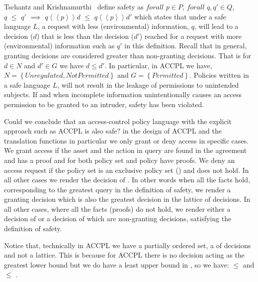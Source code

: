 Tschantz and Krishnamurthi~\cite{Tschantz} define safety as $forall$ $p \in P$, $forall$ $q, q' \in Q$, \\$q$ $\leq$ $q'$ $\implies$ $q \left\langle\left\langle p  \right\rangle\right\rangle d$ $\leq$ $q \left\langle\left\langle p  \right\rangle\right\rangle d'$ which states that under a safe language $L$, a request with less (environmental) information, $q$, will lead to a decision ($d$) that is less than the decision ($d'$) reached for a request with more (environmental) information such as $q'$ in this definition. Recall that in general, granting decisions are considered greater than non-granting decisions. That is for $d \in N$ and $d' \in G$ we have $d \leq d'$. In particular, in \ac{ACCPL} we have,  $N = \left\{ {Unregulated, NotPermitted}\right\}$ and $G = \left\{ {Permitted}\right\}$. Policies written in a safe language $L$, will not result in the leakage of permissions to unintended subjects. If and when incomplete information unintentionally causes an access permission to be granted to an intruder, safety has been violated.

Could we conclude that an access-control policy language with the explicit approach such as \ac{ACCPL} is also safe? in the design of \ac{ACCPL} and the translation functions in particular we only grant or deny access in specific cases. We grant access if the asset and the action in query are found in the agreement and  has a proof and  for both policy set and policy have proofs. We deny an access request if the policy set is an exclusive policy set () and  does not hold. In all other cases we render the decision of . In other words when all the facts hold, corresponding to the greatest query in the definition of safety, we render a granting decision which is also the greatest decision in the lattice of decisions. In all other cases, where all the facts (proofs) do not hold, we render either a decision of  or a decision of  which are non-granting decisions, satisfying the definition of safety.

Notice that, technically in \ac{ACCPL} we have a partially ordered set, a  of decisions and not a lattice. This is because for \ac{ACCPL} there is no decision acting as the greatest lower bound but we do have a least upper bound in , so we have:  $\leq$  and  $\leq$ .


